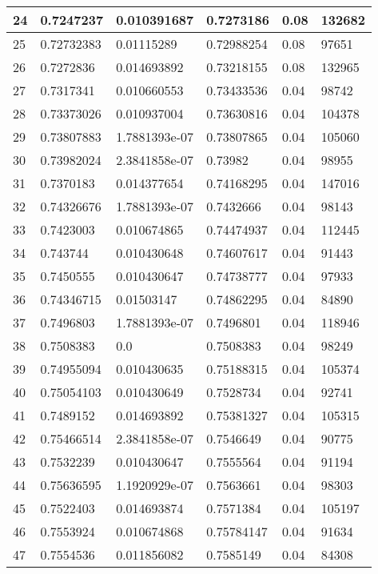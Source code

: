 \begin{longtable}{|l|l|l|l|l|l|}
24 & 0.7247237 & 0.010391687 & 0.7273186 & 0.08 & 132682 \\ \hline 
25 & 0.72732383 & 0.01115289 & 0.72988254 & 0.08 & 97651 \\ \hline 
26 & 0.7272836 & 0.014693892 & 0.73218155 & 0.08 & 132965 \\ \hline 
27 & 0.7317341 & 0.010660553 & 0.73433536 & 0.04 & 98742 \\ \hline 
28 & 0.73373026 & 0.010937004 & 0.73630816 & 0.04 & 104378 \\ \hline 
29 & 0.73807883 & 1.7881393e-07 & 0.73807865 & 0.04 & 105060 \\ \hline 
30 & 0.73982024 & 2.3841858e-07 & 0.73982 & 0.04 & 98955 \\ \hline 
31 & 0.7370183 & 0.014377654 & 0.74168295 & 0.04 & 147016 \\ \hline 
32 & 0.74326676 & 1.7881393e-07 & 0.7432666 & 0.04 & 98143 \\ \hline 
33 & 0.7423003 & 0.010674865 & 0.74474937 & 0.04 & 112445 \\ \hline 
34 & 0.743744 & 0.010430648 & 0.74607617 & 0.04 & 91443 \\ \hline 
35 & 0.7450555 & 0.010430647 & 0.74738777 & 0.04 & 97933 \\ \hline 
36 & 0.74346715 & 0.01503147 & 0.74862295 & 0.04 & 84890 \\ \hline 
37 & 0.7496803 & 1.7881393e-07 & 0.7496801 & 0.04 & 118946 \\ \hline 
38 & 0.7508383 & 0.0 & 0.7508383 & 0.04 & 98249 \\ \hline 
39 & 0.74955094 & 0.010430635 & 0.75188315 & 0.04 & 105374 \\ \hline 
40 & 0.75054103 & 0.010430649 & 0.7528734 & 0.04 & 92741 \\ \hline 
41 & 0.7489152 & 0.014693892 & 0.75381327 & 0.04 & 105315 \\ \hline 
42 & 0.75466514 & 2.3841858e-07 & 0.7546649 & 0.04 & 90775 \\ \hline 
43 & 0.7532239 & 0.010430647 & 0.7555564 & 0.04 & 91194 \\ \hline 
44 & 0.75636595 & 1.1920929e-07 & 0.7563661 & 0.04 & 98303 \\ \hline 
45 & 0.7522403 & 0.014693874 & 0.7571384 & 0.04 & 105197 \\ \hline 
46 & 0.7553924 & 0.010674868 & 0.75784147 & 0.04 & 91634 \\ \hline 
47 & 0.7554536 & 0.011856082 & 0.7585149 & 0.04 & 84308 \\ \hline 

\end{longtable}
